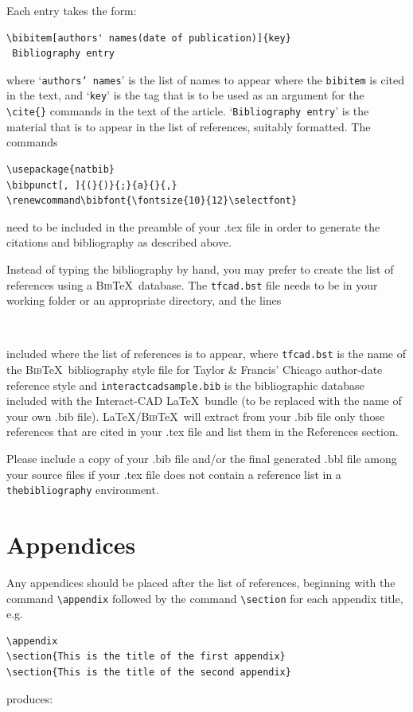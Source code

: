 \documentclass[]{interact}
\renewcommand\bibfont{\fontsize{10}{12}\selectfont}%
\theoremstyle{plain}%
\theoremstyle{definition}
\theoremstyle{remark}
\begin{document}
\bigskip
\noindent Each entry takes the form:
\begin{verbatim}
\bibitem[authors' names(date of publication)]{key}
 Bibliography entry
\end{verbatim}
where `\texttt{authors' names}' is the list of names to appear where the \verb"bibitem" is cited in the text, and `\texttt{key}' is the tag that is to be used as an argument for the \verb"\cite{}" commands in the text of the article. `\texttt{Bibliography entry}' is the material that is to appear in the list of references, suitably formatted. The commands
\begin{verbatim}
\usepackage{natbib}
\bibpunct[, ]{(}{)}{;}{a}{}{,}
\renewcommand\bibfont{\fontsize{10}{12}\selectfont}
\end{verbatim}
need to be included in the preamble of your .tex file in order to generate the citations and bibliography as described above.

Instead of typing the bibliography by hand, you may prefer to create the list of references using a \textsc{Bib}\TeX\ database. The \texttt{tfcad.bst} file needs to be in your working folder or an appropriate directory, and the lines
\begin{verbatim}


\end{verbatim}
included where the list of references is to appear, where \texttt{tfcad.bst} is the name of the \textsc{Bib}\TeX\ bibliography style file for Taylor \& Francis' Chicago author-date reference style and \texttt{interactcadsample.bib} is the bibliographic database included with the \textsf{Interact}-CAD \LaTeX\ bundle (to be replaced with the name of your own .bib file). \LaTeX/\textsc{Bib}\TeX\ will extract from your .bib file only those references that are cited in your .tex file and list them in the References section.

Please include a copy of your .bib file and/or the final generated .bbl file among your source files if your .tex file does not contain a reference list in a \texttt{thebibliography} environment.


\section{Appendices}

Any appendices should be placed after the list of references, beginning with the command \verb"\appendix" followed by the command \verb"\section" for each appendix title, e.g.
\begin{verbatim}
\appendix
\section{This is the title of the first appendix}
\section{This is the title of the second appendix}
\end{verbatim}
produces:\medskip
\end{document}
